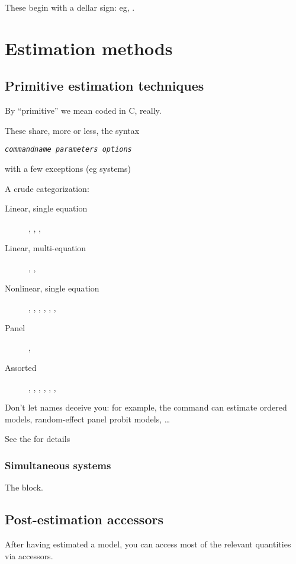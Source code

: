 These begin with a dellar sign: eg, .

\chapter{Estimation methods}

\section{Primitive estimation techniques}
\label{sec:canned}

By ``primitive'' we mean coded in C, really.

These share, more or less, the syntax
\begin{flushleft}
\texttt{\emph{commandname parameters options}}
\end{flushleft}
with a few exceptions (eg systems)

A crude categorization: 
\begin{description}
\item[Linear, single equation] , , ,
\item[Linear, multi-equation] , ,  
\item[Nonlinear, single equation] , ,
  , , , ,
\item[Panel] , 
\item[Assorted] , , ,
  , , , 
\end{description}

Don't let names deceive you: for example, the  command can
estimate ordered models, random-effect panel probit models, \ldots

See the \GCR{} for details

\subsection{Simultaneous systems}

The  block.

\section{Post-estimation accessors}
\label{sec:postest-accessors}

After having estimated a model, you can access most of the relevant
quantities via accessors.


